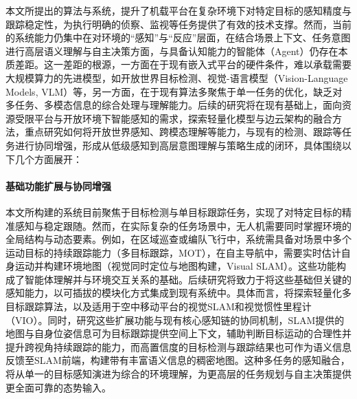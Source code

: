 本文所提出的算法与系统，提升了机载平台在复杂环境下对特定目标的感知精度与跟踪稳定性，为执行明确的侦察、监视等任务提供了有效的技术支撑。然而，当前的系统能力仍集中在对环境的“感知”与“反应”层面，在结合场景上下文、任务意图进行高层语义理解与自主决策方面，与具备认知能力的智能体（Agent）仍存在本质差距。这一差距的根源，一方面在于现有嵌入式平台的硬件条件，难以承载需要大规模算力的先进模型，如开放世界目标检测、视觉-语言模型（Vision-Language Models, VLM）等，另一方面，在于现有算法多聚焦于单一任务的优化，缺乏对多任务、多模态信息的综合处理与理解能力。后续的研究将在现有基础上，面向资源受限平台与开放环境下智能感知的需求，探索轻量化模型与边云架构的融合方法，重点研究如何将开放世界感知、跨模态理解等能力，与现有的检测、跟踪等任务进行协同增强，形成从低级感知到高层意图理解与策略生成的闭环，具体围绕以下几个方面展开：

\paragraph{基础功能扩展与协同增强}
本文所构建的系统目前聚焦于目标检测与单目标跟踪任务，实现了对特定目标的精准感知与稳定跟随。然而，在实际复杂的任务场景中，无人机需要同时掌握环境的全局结构与动态要素。例如，在区域巡查或编队飞行中，系统需具备对场景中多个运动目标的持续跟踪能力（多目标跟踪，MOT），在自主导航中，需要实时估计自身运动并构建环境地图（视觉同时定位与地图构建，Visual SLAM）。这些功能构成了智能体理解并与环境交互关系的基础。后续研究将致力于将这些基础但关键的感知能力，以可插拔的模块化方式集成到现有系统中。具体而言，将探索轻量化多目标跟踪算法，以及适用于空中移动平台的视觉SLAM和视觉惯性里程计（VIO）。同时，研究这些扩展功能与现有核心感知链的协同机制，SLAM提供的地图与自身位姿信息可为目标跟踪提供空间上下文，辅助判断目标运动的合理性并提升跨视角持续跟踪的能力，而高置信度的目标检测与跟踪结果也可作为语义信息反馈至SLAM前端，构建带有丰富语义信息的稠密地图。这种多任务的感知融合，将从单一的目标感知演进为综合的环境理解，为更高层的任务规划与自主决策提供更全面可靠的态势输入。

